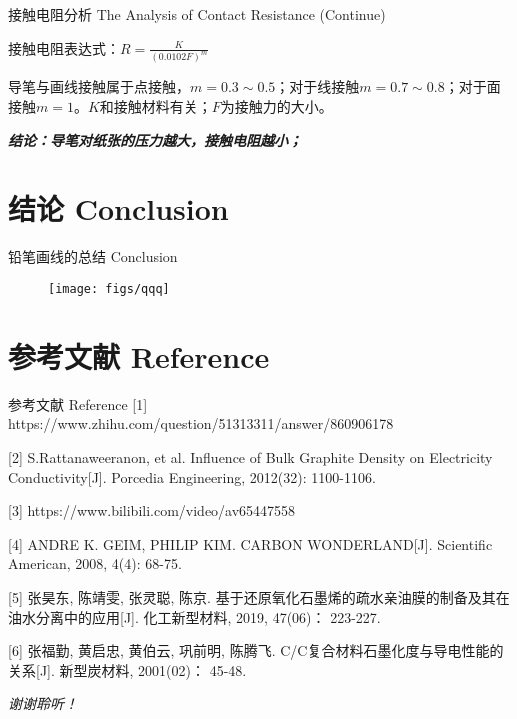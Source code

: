 \documentclass[10pt]{beamer}
\begin{document}
\begin{frame}{接触电阻分析 The Analysis of Contact Resistance (Continue)}
	\begin{theorem}
		\begin{center}
  			接触电阻表达式：$ R=\frac{K}{{(0.0102F)^m}} $
		\end{center}
	\end{theorem}
\qquad 导笔与画线接触属于点接触，$ m=0.3\sim 0.5 $；对于线接触$ m=0.7\sim 0.8 $；对于面接触$ m=1 $。$ K $和接触材料有关；$ F $为接触力的大小。\bigskip
\pause

{\large \textit{\textbf{结论：导笔对纸张的压力越大，接触电阻越小；}}}
\end{frame}

\section[Conclusion]{结论 Conclusion}
\begin{frame}{铅笔画线的总结 Conclusion}
	\begin{figure}
		\texttt{[image: figs/qqq]}
	\end{figure}
\end{frame}
\section[Reference]{参考文献 Reference}

\begin{frame}{参考文献 Reference}
[1] https://www.zhihu.com/question/51313311/answer/860906178

[2] S.Rattanaweeranon, et al. Influence of Bulk Graphite Density on Electricity Conductivity[J]. Porcedia Engineering, 2012(32): 1100-1106.

[3] https://www.bilibili.com/video/av65447558

[4] ANDRE K. GEIM, PHILIP KIM. CARBON WONDERLAND[J]. Scientific American, 2008, 4(4): 68-75.

[5] 张昊东, 陈靖雯, 张灵聪, 陈京. 基于还原氧化石墨烯的疏水亲油膜的制备及其在油水分离中的应用[J]. 化工新型材料, 2019, 47(06)： 223-227.

[6] 张福勤, 黄启忠, 黄伯云, 巩前明, 陈腾飞. C/C复合材料石墨化度与导电性能的关系[J]. 新型炭材料, 2001(02)： 45-48.
\end{frame}

\begin{frame}
\begin{center}
	\Huge \textit{谢谢聆听！}
\end{center}
	
\end{frame}
\end{document}
